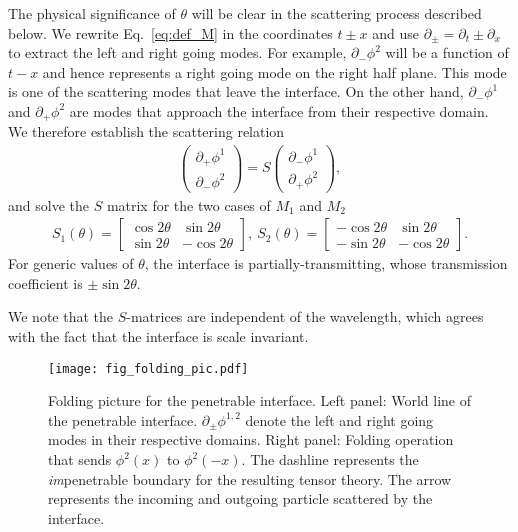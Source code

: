 The physical significance of $\theta$ will be clear in the scattering process described below. We rewrite Eq.~\eqref{eq:def_M} in the coordinates $t\pm x$ and use $\partial_{\pm} = \partial_{t} \pm \partial_x $ to extract the left and right going modes. For example, $\partial_{-} \phi^2$ will be a function of $t - x$ and hence represents a right going mode on the right half plane. This mode is one of the scattering modes that leave the interface. On the other hand, $\partial_{-} \phi^1$ and $\partial_{+} \phi^2$ are modes that approach the interface from their respective domain. We therefore establish the scattering relation 
\begin{equation}\begin{aligned}
\label{eq:def_S}
\begin{pmatrix}
\partial_+\phi^1\\
\partial_-\phi^2
\end{pmatrix}
=S
\begin{pmatrix}
\partial_-\phi^1\\
\partial_+\phi^2
\end{pmatrix},
\end{aligned}\end{equation}
and solve the $S$ matrix for the two cases of $M_1$ and $M_2$
\begin{equation}\begin{aligned}
\label{eq:S1_S2}
S_1(\theta)=\begin{bmatrix}
\cos 2\theta & \sin 2\theta \\
\sin 2\theta & -\cos 2\theta
\end{bmatrix},\
S_2(\theta)=\begin{bmatrix}
-\cos 2\theta & \sin 2\theta \\
-\sin 2\theta & -\cos 2\theta
\end{bmatrix}.
\end{aligned}\end{equation}
For generic values of $\theta$, the interface is partially-transmitting, whose transmission coefficient is $\pm \sin 2 \theta$.

We note that the $S$-matrices are independent of the wavelength, which agrees with the fact that the interface is scale invariant. 
\begin{figure}[h]
\centering
\texttt{[image: fig\_folding\_pic.pdf]}
\caption{Folding picture for the penetrable interface. Left panel: World line of the penetrable interface. $\partial_\pm\phi^{1,2}$ denote the left and right going modes in their respective domains. Right panel: Folding operation that sends $\phi^2(x)$ to $\phi^2(-x)$. The dashline represents the \emph{im}penetrable boundary for the resulting tensor theory. The arrow represents the incoming and outgoing particle scattered by the interface.}
\label{fig:folding_pic}
\end{figure}

